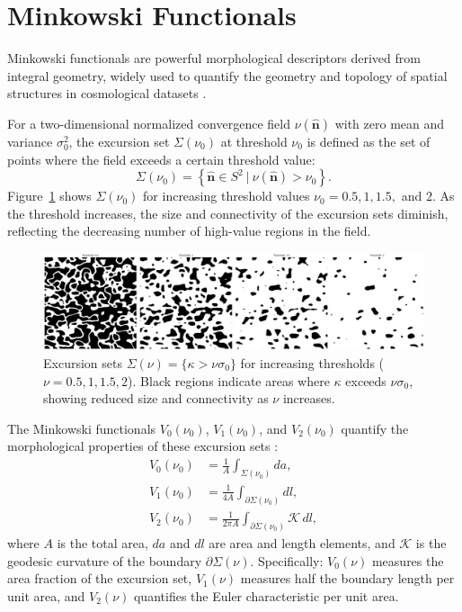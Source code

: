 \section{Minkowski Functionals}
\label{sec:minkowski_functionals}
Minkowski functionals are powerful morphological descriptors derived from integral geometry, widely used to quantify the geometry and topology of spatial structures in cosmological datasets \citep{2024arXiv241000401A}. 

For a two-dimensional normalized convergence field $\nu(\hat{\mathbf{n}})$ with zero mean and variance $\sigma_0^2$, the excursion set $\Sigma(\nu_0)$ at threshold $\nu_0$ is defined as the set of points where the field exceeds a certain threshold value:
\begin{equation}
    \Sigma(\nu_0) = \left\{ \hat{\mathbf{n}} \in S^2 \ \bigg| \ \nu(\hat{\mathbf{n}}) > \nu_0 \right\}.
\end{equation}
Figure~\ref{fig:excursion_sets} shows $\Sigma(\nu_0)$ for increasing threshold values $\nu_0 = 0.5, 1, 1.5,$ and $2$. As the threshold increases, the size and connectivity of the excursion sets diminish, reflecting the decreasing number of high-value regions in the field.
\begin{figure}[ht]
    \centering
    \includegraphics[width=\textwidth]{figures/threshold_comparison.png}
    \caption{Excursion sets $\Sigma(\nu) = \{ \kappa > \nu \sigma_0 \}$ for increasing thresholds ($\nu = 0.5, 1, 1.5, 2$). Black regions indicate areas where $\kappa$ exceeds $\nu \sigma_0$, showing reduced size and connectivity as $\nu$ increases.}
    \label{fig:excursion_sets}
\end{figure}

The Minkowski functionals $V_0(\nu_0)$, $V_1(\nu_0)$, and $V_2(\nu_0)$ quantify the morphological properties of these excursion sets \citep{2010PhRvD..81h3505M}: 
\begin{align}
    V_0(\nu_0) &= \frac{1}{A} \int_{\Sigma(\nu_0)} da, \label{eq:minkowski_V0} \\
    V_1(\nu_0) &= \frac{1}{4A} \int_{\partial \Sigma(\nu_0)} dl, \label{eq:minkowski_V1} \\
    V_2(\nu_0) &= \frac{1}{2\pi A} \int_{\partial \Sigma(\nu_0)} \mathcal{K} \, dl, \label{eq:minkowski_V2}
\end{align}
where $A$ is the total area, $da$ and $dl$ are area and length elements, and $\mathcal{K}$ is the geodesic curvature of the boundary $\partial \Sigma(\nu)$. Specifically: $V_0(\nu)$ measures the area fraction of the excursion set, $V_1(\nu)$ measures half the boundary length per unit area, and $V_2(\nu)$ quantifies the Euler characteristic per unit area.

